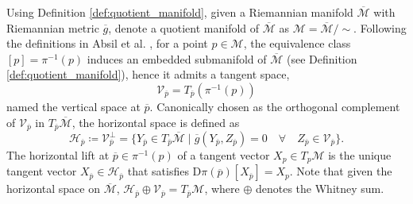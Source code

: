 \begin{definition}\label{def:horizontal_vertical_space}
    Using Definition \ref{def:quotient_manifold}, given a Riemannian manifold $\overline{\mathcal{M}}$ with Riemannian metric $\overline{g}$, denote a quotient manifold of $\overline{\mathcal{M}}$ as $\mathcal{M}=\overline{\mathcal{M}}/\sim$. Following the definitions in Absil et al. \cite[p.~43]{AbsilMahonySepulchre2008}, for a point $p\in \mathcal{M}$, the equivalence class $[p]=\pi^{-1}(p)$ induces an embedded submanifold of $\overline{\mathcal{M}}$ (see Definition \ref{def:quotient_manifold}), hence it admits a tangent space,
    \begin{equation*}
        \mathcal{V}_{\overline{p}}=T_{\overline{p}}(\pi^{-1}(p))
    \end{equation*}
    named the \textup{vertical space} at $\overline{p}$. Canonically chosen as the orthogonal complement of $\mathcal{V}_{\overline{p}}$ in $T_{\overline{p}}\overline{\mathcal{M}}$, the \textup{horizontal space} \cite[p.~48]{AbsilMahonySepulchre2008} is defined as %
    \begin{equation*}
        \mathcal{H}_{\overline{p}}\coloneqq \mathcal{V}_{\overline{p}}^\perp=\{Y_{\overline{p}}\in T_{\overline{p}}\overline{\mathcal{M}} \;|\; \overline{g}(Y_{\overline{p}},Z_{\overline{p}})=0\quad\forall\quad Z_{\overline{p}}\in \mathcal{V}_{\overline{p}} \}.
    \end{equation*}
    The \textup{horizontal lift} at $\overline{p}\in\pi^{-1}(p)$ of a tangent vector $X_{p}\in T_{p}\mathcal{M}$ is the unique tangent vector $X_{\overline{p}}\in \mathcal{H}_{\overline{p}}$ that satisfies $\mathrm{D}\pi(\overline{p})[{X}_{\overline{p}}]=X_p$. Note that given the horizontal space on $\overline{\mathcal{M}}$, $\mathcal{H}_{\overline{p}}\oplus \mathcal{V}_{\overline{p}}=T_{\overline{p}}\mathcal{M}$, where $\oplus$ denotes the Whitney sum. 
\end{definition}

